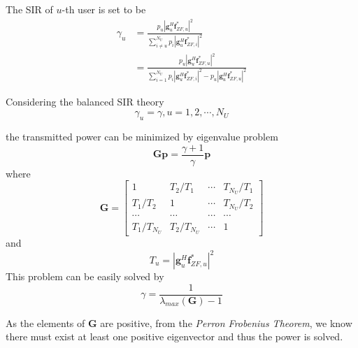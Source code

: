 \documentclass[conference]{IEEEtran}
\begin{document}
The SIR of $u$-th user is set to be 
\begin{align}
\gamma_u &= \frac{p_u|\bm{g}_u^H\bm{f}^*_{ZF,u}|^2}{\sum_{i\neq u}^{N_U}p_i|\bm{g}_u^H \bm{f}^*_{ZF,i}|^2} \nonumber\\
&= \frac{p_u|\bm{g}_u^H\bm{f}^*_{ZF,u}|^2}{\sum_{i=1}^{N_U}p_i|\bm{g}_u^H \bm{f}^*_{ZF,i}|^2 - p_u|\bm{g}_u^H \bm{f}^*_{ZF,u}|^2}
\end{align}

Considering the balanced SIR theory 
\begin{equation}
\gamma_u=\gamma, u=1,2,\cdots,N_U
\end{equation}

the transmitted power can be minimized by eigenvalue problem
\begin{equation}
\bm{Gp} = \frac{\gamma+1}{\gamma} \bm{p}
\end{equation}
where 
\begin{equation}
\bm{G}=
\begin{bmatrix}
1&T_2/T_1&\cdots&T_{N_U}/T_1\\
T_1/T_2&1&\cdots&T_{N_U}/T_2\\
\cdots&\cdots&\cdots&\cdots\\
T_1/T_{N_U}&T_2/T_{N_U}&\cdots&1
\end{bmatrix}
\end{equation}
and
\begin{equation}
T_u = |\bm{g}_u^H \bm{f}^*_{ZF,u}|^2
\end{equation}
This problem can be easily solved by 
\begin{equation}
\gamma = \frac{1}{\lambda_{max}(\bm{G})-1}
\end{equation}

As the elements of $\bm{G}$ are positive, from the \textit{Perron Frobenius Theorem}, we know there must exist at least one positive eigenvector and thus the power is solved.





\end{document}
